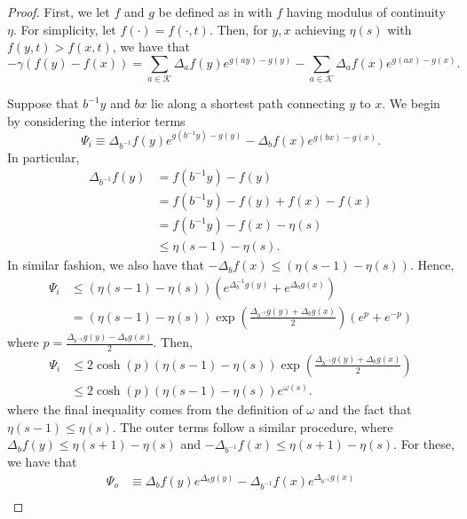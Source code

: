 \begin{proof}
	 First, we let $f$ and $g$ be defined as in  with $f$ having modulus of continuity $\eta$. For simplicity, let $f(\cdot)=f(\cdot,t)$. Then, for $y,x$ achieving $\eta(s)$ with $f(y,t) > f(x,t)$, we have that
	 \begin{equation*}
	 	-\gamma \left(f(y)-f(x)\right) = \sum_{a\in \mathcal{K}} \Delta_a f(y) e^{g(ay)-g(y)} -\sum_{a\in \mathcal{K}} \Delta_a f(x) e^{g(ax)-g(x)}.
	 \end{equation*}
	 
	 Suppose that $b^{-1}y$ and $bx$ lie along a shortest path connecting $y$ to $x$. We begin by considering the interior terms
	 \begin{equation*}
	 \Psi_i \equiv \Delta_{b^{-1}} f(y) e^{g(b^{-1}y)-g(y)} - \Delta_{b} f(x)e^{g(bx)-g(x)}.
	 \end{equation*}
	 In particular,
	 \begin{align*}
	 	\Delta_{b^{-1}}f(y) &= f(b^{-1}y)-f(y) \\
	 	&= f(b^{-1}y)-f(y) + f(x) - f(x) \\
	 	&= f(b^{-1}y)-f(x)-\eta(s) \\
	 	&\leq \eta(s-1)-\eta(s).
	 \end{align*}
	 In similar fashion, we also have that $-\Delta_b f(x) \leq \left(\eta(s-1)-\eta(s)\right)$. Hence,
	 \begin{align*}
	 	\Psi_i &\leq \left(\eta(s-1)-\eta(s)\right)\left(e^{\Delta_b^{-1}g(y)} + e^{\Delta_b g(x)} \right) \\
	 	&= \left(\eta(s-1)-\eta(s)\right)\exp\left(\frac{\Delta_{b^{-1}}g(y)+\Delta_b g(x)}{2}\right)\left(e^{p}+e^{-p}\right)
	 \end{align*}
	 where $p= \frac{\Delta_{b^{-1}}g(y)-\Delta_b g(x)}{2}$. Then,
	 \begin{align*}
	 	\Psi_i &\leq 2 \cosh(p)\left(\eta(s-1)-\eta(s)\right)\exp\left(\frac{\Delta_{b^{-1}}g(y)+\Delta_b g(x)}{2}\right) \\
	 	&\leq 2 \cosh(p) \left(\eta(s-1)-\eta(s)\right) e^{\omega(s)}.
	 \end{align*}
	 where the final inequality comes from the definition of $\omega$ and the fact that $\eta(s-1)\leq \eta(s)$. The outer terms follow a similar procedure, where $\Delta_b f(y) \leq \eta(s+1)-\eta(s)$ and $-\Delta_{b^{-1}}f(x) \leq \eta(s+1)-\eta(s)$. For these, we have that
	 \begin{align*}
	 	 \Psi_o &\equiv \Delta_{b} f(y)e^{\Delta_b g(y)} - \Delta_{b^{-1}} f(x)e^{\Delta_{b^{-1}}g(x)} \\

\end{align*}
\end{proof}
